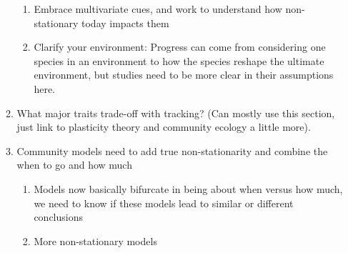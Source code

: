 \documentclass[11pt,letterpaper]{article}
\begin{document}
\begin{enumerate}
\begin{enumerate}
\begin{enumerate}
\item Embrace multivariate cues, and work to understand how non-stationary today impacts them
\item Clarify your environment: Progress can come from considering one species in an environment to how the species reshape the ultimate environment, but studies need to be more clear in their assumptions here. 
\end{enumerate}
\item What major traits trade-off with tracking? (Can mostly use this section, just link to plasticity theory and community ecology a little more). 
\item Community models need to add true non-stationarity and combine the when to go and how much
\begin{enumerate}
\item Models now basically bifurcate in being about when versus how much, we need to know if these models lead to similar or different conclusions
\item More non-stationary models
\end{enumerate}
\end{enumerate}
\end{enumerate}

\end{document}
